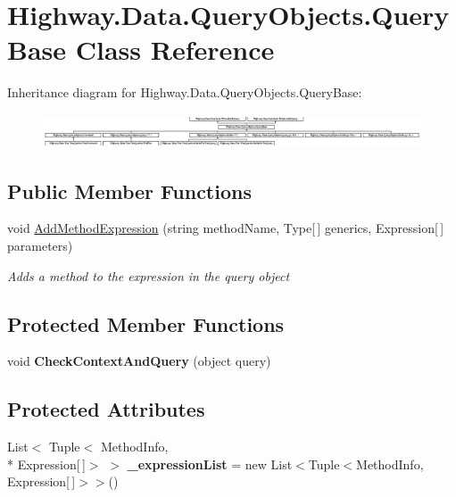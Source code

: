 \hypertarget{class_highway_1_1_data_1_1_query_objects_1_1_query_base}{\section{Highway.\-Data.\-Query\-Objects.\-Query\-Base Class Reference}
\label{class_highway_1_1_data_1_1_query_objects_1_1_query_base}
}
Inheritance diagram for Highway.\-Data.\-Query\-Objects.\-Query\-Base\-:\begin{figure}[H]
\begin{center}
\leavevmode
\includegraphics[height=1.000000cm]{class_highway_1_1_data_1_1_query_objects_1_1_query_base}
\end{center}
\end{figure}
\subsection*{Public Member Functions}
\begin{DoxyCompactItemize}
\item 
void \hyperlink{class_highway_1_1_data_1_1_query_objects_1_1_query_base_ace7c9da4af343caab20f5fdd38b47557}{Add\-Method\-Expression} (string method\-Name, Type\mbox{[}$\,$\mbox{]} generics, Expression\mbox{[}$\,$\mbox{]} parameters)
\begin{DoxyCompactList}\small\item\em Adds a method to the expression in the query object \end{DoxyCompactList}\end{DoxyCompactItemize}
\subsection*{Protected Member Functions}
\begin{DoxyCompactItemize}
\item 
\hypertarget{class_highway_1_1_data_1_1_query_objects_1_1_query_base_a2abee86dc5bd2bfa2463c343e7574dfb}{void {\bfseries Check\-Context\-And\-Query} (object query)}\label{class_highway_1_1_data_1_1_query_objects_1_1_query_base_a2abee86dc5bd2bfa2463c343e7574dfb}

\end{DoxyCompactItemize}
\subsection*{Protected Attributes}
\begin{DoxyCompactItemize}
\item 
\hypertarget{class_highway_1_1_data_1_1_query_objects_1_1_query_base_a27dce07609e00f8553b79790cc8a9d1d}{List$<$ Tuple$<$ Method\-Info, \\*
Expression\mbox{[}$\,$\mbox{]}$>$ $>$ {\bfseries \-\_\-expression\-List} = new List$<$Tuple$<$Method\-Info, Expression\mbox{[}$\,$\mbox{]}$>$$>$()}\label{class_highway_1_1_data_1_1_query_objects_1_1_query_base_a27dce07609e00f8553b79790cc8a9d1d}

\end{DoxyCompactItemize}
